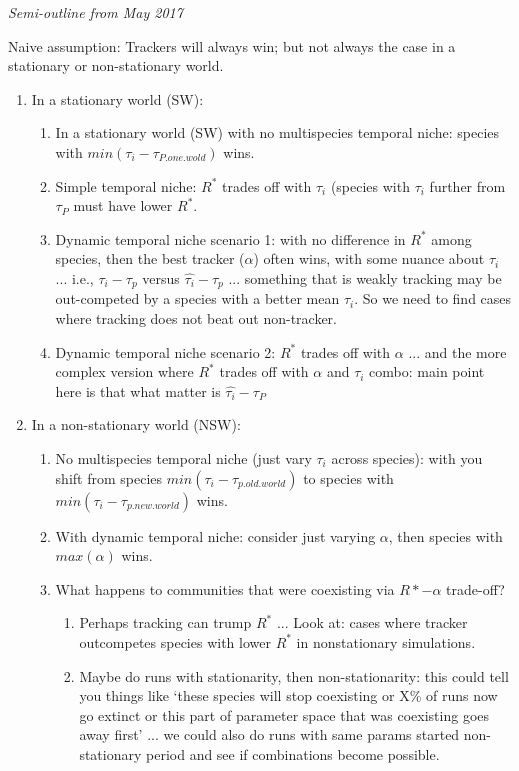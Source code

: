 \documentclass[11pt,letterpaper]{article}
\renewcommand{\subsection}[1]{%
\bigskip
\begin{center}
\begin{large}
\normalfont\itshape #1
\end{large}
\end{center}}
\begin{document}
\subsection{Semi-outline from May 2017} Naive assumption: Trackers will always win; but not always the case in a stationary or non-stationary world. 

\begin{enumerate} 
\item In a stationary world (SW):
\begin{enumerate} 
\item In a stationary world (SW) with no multispecies temporal niche: species with $min(\tau_i - \tau_{P.one.wold})$ wins. 
\item  Simple temporal niche: $R^*$ trades off with $\tau_i$ (species with $\tau_i$ further from $\tau_P$ must have lower $R^*$.
\item Dynamic temporal niche scenario 1: with no difference in $R^*$ among species, then the best tracker ($\alpha$) often wins, with some nuance about $\tau_i$ ... i.e., $\tau_i - \tau_p$ versus $\hat{\tau_i} - \tau_p$ ... something that is weakly tracking may be out-competed by a species with a better mean $\tau_i$. So we need to find cases where tracking does not beat out non-tracker. 
\item  Dynamic temporal niche scenario 2:  $R^*$ trades off with $\alpha$ ... and the more complex version where $R^*$ trades off with $\alpha$ and $\tau_i$ combo: main point here is that what matter is $\hat{\tau_i}-\tau_P$
\end{enumerate} 
\item  In a non-stationary world (NSW):
\begin{enumerate} 
\item No multispecies temporal niche (just vary $\tau_i$ across species): with you shift from species $min(\tau_i - \tau_{p.old.world})$ to species with $min(\tau_i - \tau_{p.new.world})$ wins. 
\item With dynamic temporal niche: consider just varying $\alpha$, then species with $max(\alpha)$ wins. 
\item What happens to communities that were coexisting via $R*-\alpha$ trade-off? 
\begin{enumerate}
\item Perhaps tracking can trump $R^*$ ... Look at: cases where tracker outcompetes species with lower $R^*$ in nonstationary simulations.
\item Maybe do runs with stationarity, then non-stationarity: this could tell you things like `these species will stop coexisting or X\% of runs now go extinct or this part of parameter space that was coexisting goes away first' ... we could also do runs with same params started non-stationary period and see if combinations become possible. \\ 
\end{enumerate}
\end{enumerate} 
\end{enumerate} 
\end{document}
